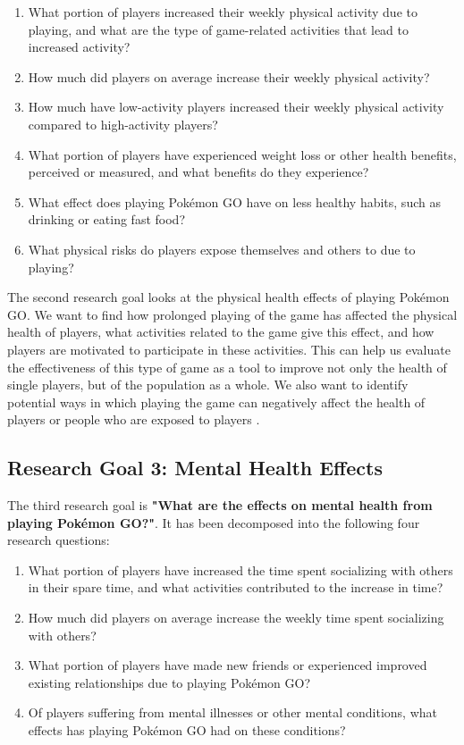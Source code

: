 \begin{enumerate}[label=RQ2.{\arabic*}]
	\item What portion of players increased their weekly physical activity due to playing, and what are the type of game-related activities that lead to increased activity?\label{RQ2.1}
	\item How much did players on average increase their weekly physical activity?\label{RQ2.2}
	\item How much have low-activity players increased their weekly physical activity compared to high-activity players?\label{RQ2.3}
	\item What portion of players have experienced weight loss or other health benefits, perceived or measured, and what benefits do they experience?\label{RQ2.4}
	\item What effect does playing Pokémon GO have on less healthy  habits, such as drinking or eating fast food?\label{RQ2.5}
	\item What physical risks do players expose themselves and others to due to playing?\label{RQ2.6}
\end{enumerate}

The second research goal looks at the physical health effects of playing Pokémon GO. We want to find how prolonged playing of the game has affected the physical health of players, what activities related to the game give this effect, and how players are motivated to participate in these activities. This can help us evaluate the effectiveness of this type of game as a tool to improve not only the health of single players, but of the population as a whole. We also want to identify potential ways in which playing the game can negatively affect the health of players or people who are exposed to players .

\subsection{Research Goal 3: Mental Health Effects}
\label{rg3}

The third research goal is \textbf{"What are the effects on mental health from playing Pokémon GO?"}. It has been decomposed into the following four research questions:

\begin{enumerate}[label=RQ3.{\arabic*}]
	\item What portion of players have increased the time spent socializing with others in their spare time, and what activities contributed to the increase in time?\label{RQ3.1}
	\item How much did players on average increase the weekly time spent socializing with others?\label{RQ3.2}
	\item What portion of players have made new friends or experienced improved existing relationships due to playing Pokémon GO?\label{RQ3.3}
	\item Of players suffering from mental illnesses or other mental conditions, what effects has playing Pokémon GO had on these conditions?\label{RQ3.4}
\end{enumerate}

